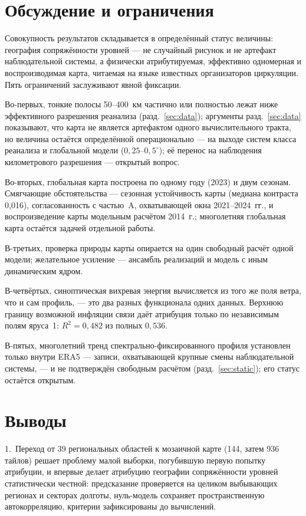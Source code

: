 \documentclass[11pt,a4paper]{article}
\begin{document}
\section{Обсуждение и ограничения}
\label{sec:limitations}

Совокупность результатов складывается в определённый статус величины: география сопряжённости уровней --- не случайный рисунок и не артефакт наблюдательной системы, а физически атрибутируемая, эффективно одномерная и воспроизводимая карта, читаемая на языке известных организаторов циркуляции. Пять ограничений заслуживают явной фиксации.

Во-первых, тонкие полосы 50--400~км частично или полностью лежат ниже эффективного разрешения реанализа (разд.~\ref{sec:data}); аргументы разд.~\ref{sec:data} показывают, что карта не является артефактом одного вычислительного тракта, но величина остаётся определённой операционально --- на выходе систем класса реанализа и глобальной модели ($0{,}25$--$0{,}5^\circ$); её перенос на наблюдения километрового разрешения --- открытый вопрос.

Во-вторых, глобальная карта построена по одному году (2023) и двум сезонам. Смягчающие обстоятельства --- сезонная устойчивость карты (медиана контраста 0,016), согласованность с частью~A, охватывающей окна 2021--2024~гг., и воспроизведение карты модельным расчётом 2014~г.; многолетняя глобальная карта остаётся задачей отдельной работы.

В-третьих, проверка природы карты опирается на один свободный расчёт одной модели; желательное усиление --- ансамбль реализаций и модель с иным динамическим ядром.

В-четвёртых, синоптическая вихревая энергия вычисляется из того же поля ветра, что и сам профиль, --- это два разных функционала одних данных. Верхнюю границу возможной инфляции связи даёт атрибуция только по независимым полям яруса~1: $R^2=0{,}482$ из полных $0{,}536$.

В-пятых, многолетний тренд спектрально-фиксированного профиля установлен только внутри ERA5 --- записи, охватывающей крупные смены наблюдательной системы, --- и не подтверждён свободным расчётом (разд.~\ref{sec:static}); его статус остаётся открытым.

\section{Выводы}
\label{sec:conclusion}

1.~Переход от 39 региональных областей к мозаичной карте (144, затем 936 тайлов) решает проблему малой выборки, погубившую первую попытку атрибуции, и впервые делает атрибуцию географии сопряжённости уровней статистически честной: предсказание проверяется на целиком выбывающих регионах и секторах долготы, нуль-модель сохраняет пространственную автокорреляцию, критерии зафиксированы до вычислений.
\end{document}
